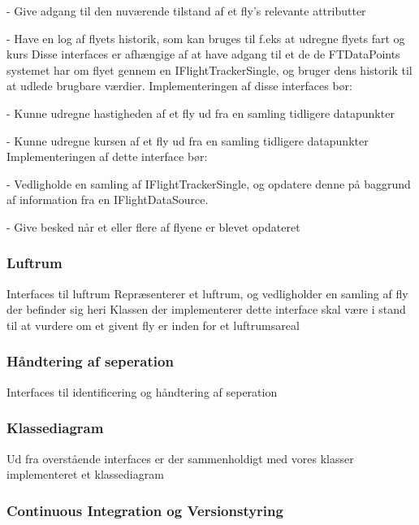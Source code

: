 - Give adgang til den nuværende tilstand af et fly's relevante attributter

- Have en log af flyets historik, som kan bruges til f.eks at udregne flyets fart og kurs
Disse interfaces er afhængige af at have adgang til et de de FTDataPoints systemet har om flyet gennem en IFlightTrackerSingle, og bruger dens historik til at udlede brugbare værdier.
Implementeringen af disse interfaces bør:

- Kunne udregne hastigheden af et fly ud fra en samling tidligere datapunkter

- Kunne udregne kursen af et fly ud fra en samling tidligere datapunkter
Implementeringen af dette interface bør:

- Vedligholde en samling af IFlightTrackerSingle, og opdatere denne på baggrund af information fra en IFlightDataSource.

- Give besked når et eller flere af flyene er blevet opdateret
\newpage
\subsubsection{Luftrum}

{Interfaces til luftrum}
Repræsenterer et luftrum, og vedligholder en samling af fly der befinder sig heri
Klassen der implementerer dette interface skal være i stand til at vurdere om et givent fly er inden for et luftrumsareal
\subsubsection{Håndtering af seperation}
{Interfaces til identificering og håndtering af seperation}

\subsubsection{Klassediagram}
Ud fra overstående interfaces er der sammenholdigt med vores klasser implementeret et klassediagram


\subsubsection{Continuous Integration og Versionstyring}

